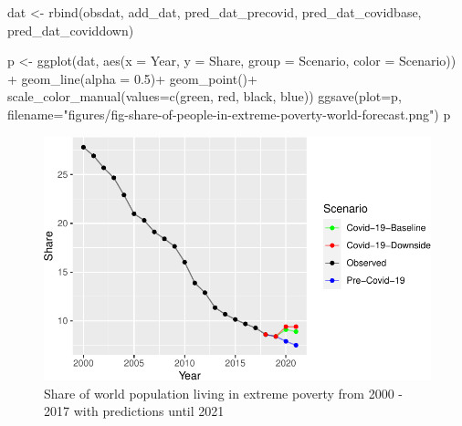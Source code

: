 \documentclass[
  letterpaper,
]{scrbook}
\newenvironment{Shaded}{\begin{snugshade}}{\end{snugshade}}
\newcommand{\AttributeTok}[1]{\textcolor[rgb]{0.40,0.45,0.13}{#1}}
\newcommand{\FloatTok}[1]{\textcolor[rgb]{0.68,0.00,0.00}{#1}}
\newcommand{\FunctionTok}[1]{\textcolor[rgb]{0.28,0.35,0.67}{#1}}
\newcommand{\NormalTok}[1]{\textcolor[rgb]{0.00,0.23,0.31}{#1}}
\newcommand{\OtherTok}[1]{\textcolor[rgb]{0.00,0.23,0.31}{#1}}
\newcommand{\SpecialCharTok}[1]{\textcolor[rgb]{0.37,0.37,0.37}{#1}}
\newcommand{\StringTok}[1]{\textcolor[rgb]{0.13,0.47,0.30}{#1}}
\begin{document}
\begin{Shaded}
\begin{Highlighting}[]
\NormalTok{dat }\OtherTok{\textless{}{-}} \FunctionTok{rbind}\NormalTok{(obsdat, add\_dat, pred\_dat\_precovid, pred\_dat\_covidbase, pred\_dat\_coviddown)}

\NormalTok{p }\OtherTok{\textless{}{-}} \FunctionTok{ggplot}\NormalTok{(dat, }\FunctionTok{aes}\NormalTok{(}\AttributeTok{x =}\NormalTok{ Year, }\AttributeTok{y =}\NormalTok{ Share, }\AttributeTok{group =}\NormalTok{ Scenario, }\AttributeTok{color =}\NormalTok{ Scenario)) }\SpecialCharTok{+} 
  \FunctionTok{geom\_line}\NormalTok{(}\AttributeTok{alpha =} \FloatTok{0.5}\NormalTok{)}\SpecialCharTok{+}
  \FunctionTok{geom\_point}\NormalTok{()}\SpecialCharTok{+}
  \FunctionTok{scale\_color\_manual}\NormalTok{(}\AttributeTok{values=}\FunctionTok{c}\NormalTok{(}\StringTok{\textquotesingle{}green\textquotesingle{}}\NormalTok{, }\StringTok{\textquotesingle{}red\textquotesingle{}}\NormalTok{, }\StringTok{\textquotesingle{}black\textquotesingle{}}\NormalTok{, }\StringTok{\textquotesingle{}blue\textquotesingle{}}\NormalTok{))}
\FunctionTok{ggsave}\NormalTok{(}\AttributeTok{plot=}\NormalTok{p, }\AttributeTok{filename=}\StringTok{"figures/fig{-}share{-}of{-}people{-}in{-}extreme{-}poverty{-}world{-}forecast.png"}\NormalTok{)}
\NormalTok{p}
\end{Highlighting}
\end{Shaded}

\begin{figure}[H]

{\centering \includegraphics{./introduction_files/figure-pdf/fig-share-of-people-in-extreme-poverty-world-forecast-1.pdf}

}

\caption{\label{fig-share-of-people-in-extreme-poverty-world-forecast}Share
of world population living in extreme poverty from 2000 - 2017 with
predictions until 2021}

\end{figure}
\end{document}
